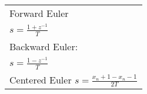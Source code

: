 \begin{tabular}{@{}L@{}}
Forward Euler\\
$s = \frac{1 + z^{-1}}{T}$\\
Backward Euler: \\
$s = \frac{1 - z^{-1}}{T}$\\
Centered Euler
$s  = \frac{x_n + 1 - x_n - 1}{2T}$
\end{tabular}
